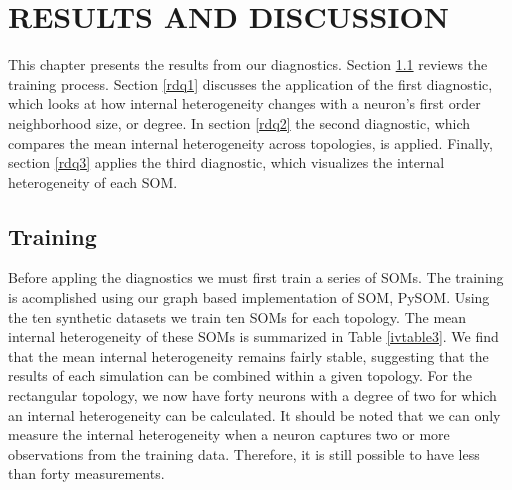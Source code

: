 \chapter{RESULTS AND DISCUSSION}
This chapter presents the results from our diagnostics.  Section \ref{rtrain}
reviews the training process.  Section \ref{rdq1} discusses the application of
the first diagnostic, which looks at how internal heterogeneity changes with a
neuron's first order neighborhood size, or degree.  In section \ref{rdq2} the
second diagnostic, which compares the mean internal heterogeneity across
topologies, is applied.  Finally, section \ref{rdq3} applies the third
diagnostic, which visualizes the internal heterogeneity of each SOM.

\section{Training}
\label{rtrain}
Before appling the diagnostics we must first train a series of SOMs.  The
training is acomplished using our graph based implementation of SOM, PySOM.
Using the ten synthetic datasets we train ten SOMs for each topology.  The
mean internal heterogeneity of these SOMs is summarized in Table
\ref{ivtable3}.  We find that the mean internal heterogeneity remains fairly
stable, suggesting that the results of each simulation can be combined within
a given topology.  For the rectangular topology, we now have forty neurons
with a degree of two for which an internal heterogeneity can be calculated. It
should be noted that we can only measure the internal heterogeneity when a
neuron captures two or more observations from the training data.  Therefore,
it is still possible to have less than forty measurements.

